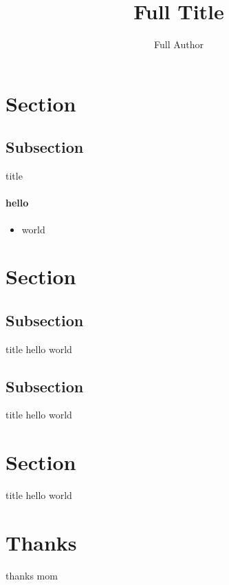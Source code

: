 \documentclass[
  color=002244,
  logo=fig/logo,
]{slides}
\title[Short Title]{Full Title}
\author[Short Author]{Full Author}
\institute{Institute}
\begin{document}
  \maketitle
  \section{Section}
  \subsection{Subsection}
  \begin{frame}{title}
    \paragraph{hello}
    \begin{itemize}
      \item world
    \end{itemize}
  \end{frame}
  \section{Section}
  \subsection{Subsection}
  \begin{frame}{title}
    hello world
  \end{frame}
  \subsection{Subsection}
  \begin{frame}{title}
    hello world
  \end{frame}
  \section{Section}
  \begin{frame}{title}
    hello world
  \end{frame}
  \section[]{Thanks} %
  \begin{frame}{thanks}
    mom
  \end{frame}
\end{document}
